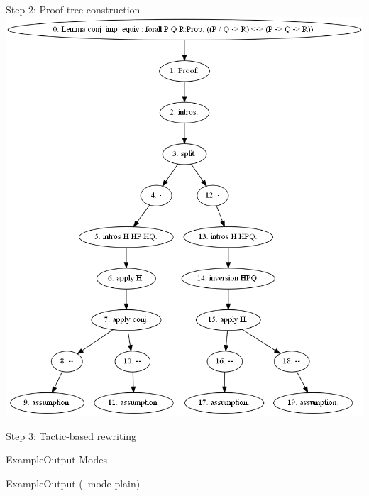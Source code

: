 \documentclass[pdf]{beamer}
\begin{document}
\begin{frame}{Step 2: Proof tree construction}
    \vspace{-13pt}\center\includegraphics[height=0.85\textheight]{images/proof-tree.png}
\end{frame}

\begin{frame}{Step 3: Tactic-based rewriting}

\end{frame}

\begin{frame}{Example}{Output Modes}
\end{frame}

\begin{frame}{Example}{Output (--mode plain)}
\end{frame}
\end{document}
